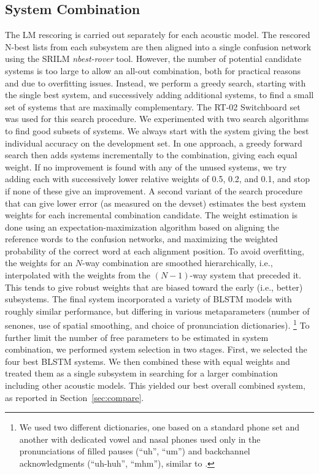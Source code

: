 \documentclass{article}
\begin{document}
\subsection{System Combination}
	\label{sec:combination}
The LM rescoring is carried out separately for each acoustic model.
The rescored N-best lists from each subsystem are then aligned into a single confusion 
network \cite{sri-2000} using the SRILM {\em nbest-rover} tool.
However, the number of potential candidate systems is too large to allow an all-out combination,
both for practical reasons and due to overfitting issues.
Instead, we perform a greedy search, starting with the single best system, and 
successively adding additional systems,
to find a small set of systems that are maximally complementary.
The RT-02 Switchboard set was used for this search procedure.
We experimented with two search algorithms to find good subsets of systems.
We always start with the system giving the best individual accuracy on the development set.
In one approach, a greedy forward search then adds systems incrementally to the combination, giving each equal
weight.  If no improvement is found with any of the unused systems, we try adding each with successively
lower relative weights of 0.5, 0.2, and 0.1, and stop if none of these give an improvement.
A second variant of the search procedure that can give lower error (as measured on the devset)
estimates the best system weights for each incremental combination candidate.
The weight estimation is done using an expectation-maximization algorithm based on aligning the reference words 
to the confusion networks, and maximizing the weighted probability of the correct word at each alignment position.
To avoid overfitting, the weights for an $N$-way combination are smoothed hierarchically, i.e., interpolated with the
weights from the $(N-1)$-way system that preceded it.
This tends to give robust weights that are biased toward the early (i.e., better) subsystems.
The final system incorporated a variety of BLSTM models with roughly similar performance,
but differing in various metaparameters
(number of senones, use of spatial smoothing, and choice of pronunciation dictionaries).%
\footnote{We used two different dictionaries, one based on a standard phone set and another with
dedicated vowel and nasal phones used only in the pronunciations of filled pauses (``uh'', ``um'')
and backchannel acknowledgments (``uh-huh'', ``mhm''), similar to \cite{sri-2000}.}
To further limit the number of free parameters to be estimated in system combination, we performed system selection
in two stages.  First, we selected the four best BLSTM systems.
We then combined these with equal weights and treated them as a single subsystem in searching for
a larger combination including other acoustic models.
This yielded our best overall combined system, as reported in Section~\ref{sec:compare}.
\end{document}
